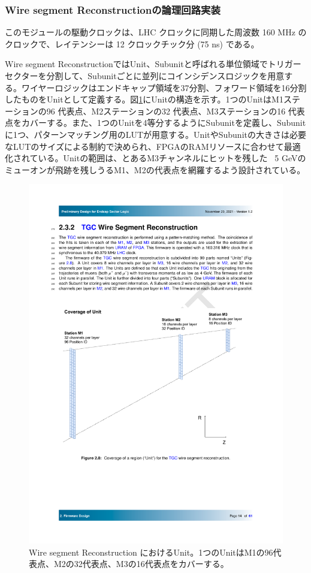 \subsubsection*{Wire segment Reconstructionの論理回路実装}
このモジュールの駆動クロックは、LHC クロックに同期した周波数 160 MHz のクロックで、レイテンシーは 12 クロックチック分 (75 ns) である。

Wire segment ReconstructionではUnit、Subunitと呼ばれる単位領域でトリガーセクターを分割して、Subunitごとに並列にコインシデンスロジックを用意する。ワイヤーロジックはエンドキャップ領域を37分割、フォワード領域を16分割したものをUnitとして定義する。図\ref{StationCoin_unit}にUnitの構造を示す。1つのUnitはM1ステーションの96 代表点、M2ステーションの32 代表点、M3ステーションの16 代表点をカバーする。また、1つのUnitを4等分するようにSubunitを定義し、Subunitに1つ、パターンマッチング用のLUTが用意する。UnitやSubunitの大きさは必要なLUTのサイズによる制約で決められ、FPGAのRAMリソースに合わせて最適化されている。Unitの範囲は、とあるM3チャンネルにヒットを残した \pt$\,$ 5 GeVのミューオンが飛跡を残しうるM1、M2の代表点を網羅するよう設計されている。

\begin{figure} 
    \centering
    \includegraphics[width=12cm]{fig/SL/StationCoin_unit.pdf}
    \caption[Wire segment Reconstruction におけるUnit]{Wire segment Reconstruction におけるUnit\cite{SLPDR}。1つのUnitはM1の96代表点、M2の32代表点、M3の16代表点をカバーする。}
    \label{StationCoin_unit}
\end{figure}

